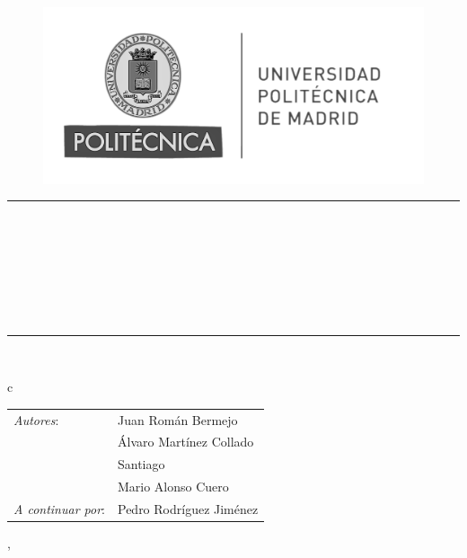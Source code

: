 \begin{titlepage}
	\begin{center}
		\vspace*{0in}
		\begin{figure}[htb]
			\centering
			\includegraphics[width=0.6\linewidth]{./Figures/Portada_HF/upm_logo.png}
		\end{figure}
		
		\vspace*{0.2in}
		\rule{\linewidth}{0.4mm}\\
		\vspace*{0.1in}
		\begin{huge}
			\textbf{\scshape{\ProjectTitle}} \\
		\end{huge}
		\vspace*{0.1in}
		\begin{large}
			\begin{normalsize}
				\scshape{\Project}\\
				\scshape{\ProjectSubject}
			\end{normalsize}
		\end{large} \\
  
		\vspace*{1em}
		\rule{\linewidth}{0.4mm}\\
		\vspace*{0.1in}
		\begin{large}
			\begin{tabular}{c}
				\\
				\begin{tabular}{ l l }
					\textit{Autores}: & Juan Román Bermejo       \\
					                   & Álvaro Martínez Collado  \\
                                          & Santiago                 \\
                                          & Mario Alonso Cuero       \\
                        \textit{A continuar por}: & Pedro Rodríguez Jiménez       \\
				\end{tabular}
			\end{tabular}
		\end{large}

  
		\vspace*{2in}
		\begin{large}
			\textsc{\ProjectLocation, \ProjectDate}
		\end{large}
	\end{center}

    \newpage
    \thispagestyle{empty}
    \mbox{}
    \newpage
    
\end{titlepage}
